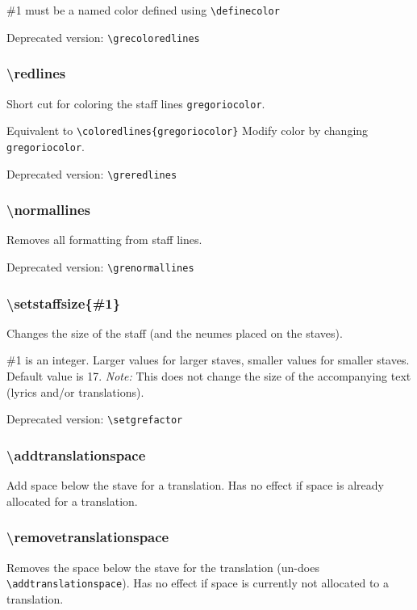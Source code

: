 \#1 must be a named color defined using \verb=\definecolor=

\smallskip\indent Deprecated version: \verb=\grecoloredlines=

\subsubsection*{\textbackslash redlines}
Short cut for coloring the staff lines \verb=gregoriocolor=.

Equivalent to \verb=\coloredlines{gregoriocolor}= Modify color by
changing \verb=gregoriocolor=.

\smallskip\indent Deprecated version: \verb=\greredlines=

\subsubsection*{\textbackslash normallines}
Removes all formatting from staff lines.

\smallskip\indent Deprecated version: \verb=\grenormallines=

\subsubsection*{\textbackslash setstaffsize\{\#1\}}
Changes the size of the staff (and the neumes placed on the staves).

\#1 is an integer. Larger values for larger staves, smaller values for
smaller staves.  Default value is 17.  \emph{Note:} This does not
change the size of the accompanying text (lyrics and/or translations).

\smallskip\indent Deprecated version: \verb=\setgrefactor=

\subsubsection*{\textbackslash addtranslationspace}
Add space below the stave for a translation.  Has no effect if space
is already allocated for a translation.

\subsubsection*{\textbackslash removetranslationspace}
Removes the space below the stave for the translation (un-does
\verb=\addtranslationspace=). Has no effect if space is currently not
allocated to a translation.

